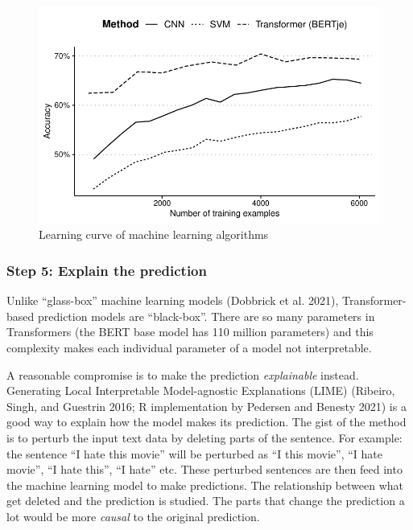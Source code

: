 \documentclass[
]{ccr}
\begin{document}
\begin{figure}

{\centering \includegraphics{grafzahl_sp_files/figure-pdf/fig-fig1-1.pdf}

}

\caption{\label{fig-fig1}Learning curve of machine learning algorithms}

\end{figure}

\hypertarget{step-5-explain-the-prediction}{%
\subsubsection{Step 5: Explain the
prediction}\label{step-5-explain-the-prediction}}

Unlike ``glass-box'' machine learning models (Dobbrick et al. 2021),
Transformer-based prediction models are ``black-box''. There are so many
parameters in Transformers (the BERT base model has 110 million
parameters) and this complexity makes each individual parameter of a
model not interpretable.

A reasonable compromise is to make the prediction \emph{explainable}
instead. Generating Local Interpretable Model-agnostic Explanations
(LIME) (Ribeiro, Singh, and Guestrin 2016; R implementation by Pedersen
and Benesty 2021) is a good way to explain how the model makes its
prediction. The gist of the method is to perturb the input text data by
deleting parts of the sentence. For example: the sentence ``I hate this
movie'' will be perturbed as ``I this movie'', ``I hate movie'', ``I
hate this'', ``I hate'' etc. These perturbed sentences are then feed
into the machine learning model to make predictions. The relationship
between what get deleted and the prediction is studied. The parts that
change the prediction a lot would be more \emph{causal} to the original
prediction.
\end{document}
